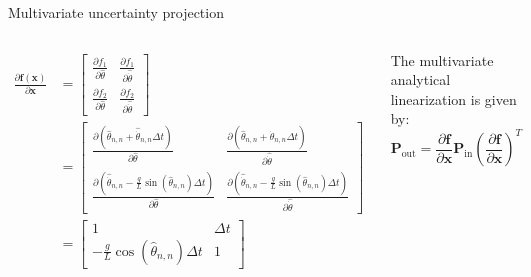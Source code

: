 \begin{frame}{Multivariate uncertainty projection}
\begin{columns}
\begin{align*}
 \frac{\partial \mathbf{f}(\mathbf{x})}{\partial \mathbf{x}} & =
\begin{bmatrix}
\frac{\partial f_1}{\partial \hat{\theta}} & \frac{\partial f_1}{\partial \hat{\dot{\theta}}} \\
\frac{\partial f_2}{\partial \hat{\theta}} & \frac{\partial f_2}{\partial \hat{\dot{\theta}}}
\end{bmatrix} \\ &=
\begin{bmatrix}
\frac{\partial (\hat{\theta}_{n,n} + \hat{\dot{\theta}}_{n,n} \Delta t)}{\partial \hat{\theta}} & \frac{\partial (\hat{\theta}_{n,n} + \hat{\dot{\theta}}_{n,n} \Delta t)}{\partial \hat{\dot{\theta}}} \\
\frac{\partial (\hat{\dot{\theta}}_{n,n} - \frac{g}{L} \sin(\hat{\theta}_{n,n}) \Delta t)}{\partial \hat{\theta}} & \frac{\partial (\hat{\dot{\theta}}_{n,n} - \frac{g}{L} \sin(\hat{\theta}_{n,n}) \Delta t)}{\partial \hat{\dot{\theta}}}
\end{bmatrix} \\ &=
\begin{bmatrix}
1 & \Delta t \\
-\frac{g}{L} \cos(\hat{\theta}_{n,n}) \Delta t & 1
\end{bmatrix}
\end{align*}

The multivariate analytical linearization is given by:
\[
\mathbf{P}_{\text{out}} = \frac{\partial \mathbf{f}}{\partial \mathbf{x}} \mathbf{P}_{\text{in}} \left( \frac{\partial \mathbf{f}}{\partial \mathbf{x}} \right)^T
\]
\end{columns}
\end{frame}



